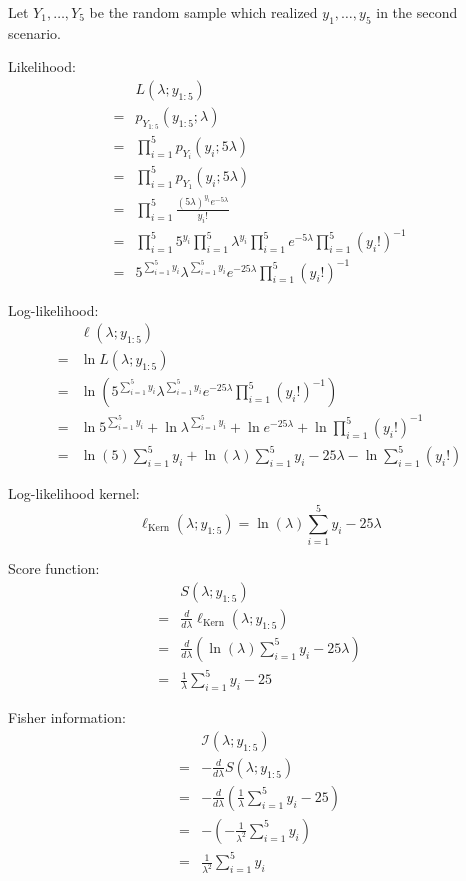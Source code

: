 \documentclass{article}
\begin{document}
\begin{ssolution}
Let \(Y_1,\ldots,Y_5\) be the random sample which realized \(y_1,\ldots,y_5\) in the second scenario.

Likelihood:
\begin{align*}
	& L(\lambda;y_{1:5}) \\
	=& p_{Y_{1:5}}(y_{1:5};\lambda) \\
	=& \prod_{i=1}^5 p_{Y_i}(y_i;5\lambda) \\
	=& \prod_{i=1}^5 p_{Y_1}(y_i;5\lambda) \\
	=& \prod_{i=1}^5 \frac{(5\lambda)^{y_i} e^{-5\lambda}}{y_i!} \\
	=& \prod_{i=1}^5 5^{y_i} \prod_{i=1}^5\lambda^{y_i} \prod_{i=1}^5e^{-5\lambda} \prod_{i=1}^5(y_i!)^{-1} \\
	=& 5^{\sum_{i=1}^5 y_i} \lambda^{\sum_{i=1}^5 y_i} e^{-25\lambda} \prod_{i=1}^5(y_i!)^{-1}
\end{align*}

Log-likelihood:
\begin{align*}
	& \ell(\lambda;y_{1:5}) \\
	=& \ln L(\lambda;y_{1:5}) \\
	=& \ln \left( 5^{\sum_{i=1}^5 y_i} \lambda^{\sum_{i=1}^5 y_i} e^{-25\lambda} \prod_{i=1}^5(y_i!)^{-1} \right) \\
	=& \ln 5^{\sum_{i=1}^5 y_i} + \ln\lambda^{\sum_{i=1}^5 y_i} + \ln e^{-25\lambda} + \ln \prod_{i=1}^5(y_i!)^{-1} \\
	=& \ln(5)\sum_{i=1}^5 y_i + \ln(\lambda)\sum_{i=1}^5 y_i - 25\lambda - \ln \sum_{i=1}^5(y_i!)
\end{align*}

Log-likelihood kernel:
\[\ell_{\text{Kern}}(\lambda;y_{1:5}) = \ln(\lambda)\sum_{i=1}^5 y_i - 25\lambda \]

Score function:
\begin{align*}
	& S(\lambda;y_{1:5}) \\
	=& \frac{d}{d\lambda}\ell_{\text{Kern}}(\lambda;y_{1:5}) \\
	=& \frac{d}{d\lambda} \left(\ln(\lambda)\sum_{i=1}^5 y_i - 25\lambda\right) \\
	=& \frac{1}{\lambda}\sum_{i=1}^5 y_i - 25
\end{align*}

Fisher information:
\begin{align*}
	& \mathcal{I}(\lambda;y_{1:5}) \\
	=& -\frac{d}{d\lambda}S(\lambda;y_{1:5}) \\
	=& -\frac{d}{d\lambda}\left( \frac{1}{\lambda}\sum_{i=1}^5 y_i - 25 \right) \\
	=& -\left( -\frac{1}{\lambda^2}\sum_{i=1}^5 y_i \right) \\
	=& \frac{1}{\lambda^2}\sum_{i=1}^5 y_i
\end{align*}


\end{ssolution}
\end{document}
